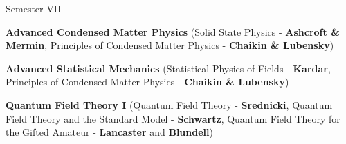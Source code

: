 \begin{cventries}
\cventry
{Semester VII} %
{} %
{} %
{} %
{
	\begin{cvitems} %
		\item {\textbf{Advanced Condensed Matter Physics} (Solid State Physics - \textbf{Ashcroft \& Mermin}, Principles of Condensed Matter Physics - \textbf{Chaikin \& Lubensky})}
		\item {\textbf{Advanced Statistical Mechanics} (Statistical Physics of Fields - \textbf{Kardar}, Principles of Condensed Matter Physics - \textbf{Chaikin \& Lubensky})}
		\item {\textbf{Quantum Field Theory I} (Quantum Field Theory - \textbf{Srednicki}, Quantum Field Theory and the Standard Model - \textbf{Schwartz}, Quantum Field Theory for the Gifted Amateur - \textbf{Lancaster} and \textbf{Blundell})}
	\end{cvitems}
}
\end{cventries}

